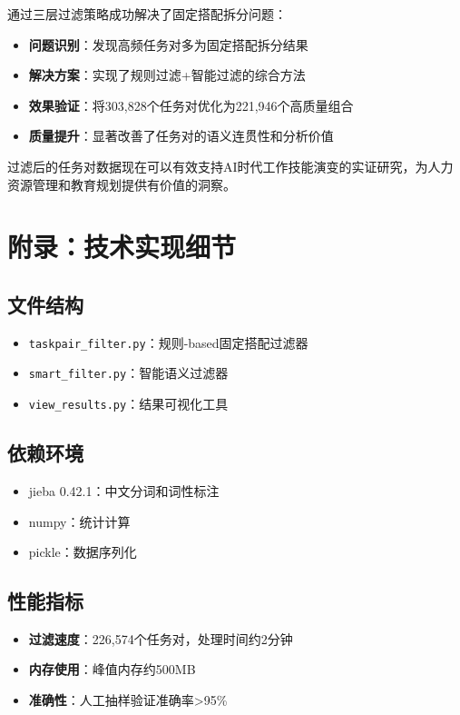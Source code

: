 \documentclass[11pt,a4paper]{article}
\begin{document}
通过三层过滤策略成功解决了固定搭配拆分问题：

\begin{itemize}
    \item \textbf{问题识别}：发现高频任务对多为固定搭配拆分结果
    \item \textbf{解决方案}：实现了规则过滤+智能过滤的综合方法
    \item \textbf{效果验证}：将303,828个任务对优化为221,946个高质量组合
    \item \textbf{质量提升}：显著改善了任务对的语义连贯性和分析价值
\end{itemize}

过滤后的任务对数据现在可以有效支持AI时代工作技能演变的实证研究，为人力资源管理和教育规划提供有价值的洞察。

\section{附录：技术实现细节}

\subsection{文件结构}

\begin{itemize}
    \item \texttt{taskpair\_filter.py}：规则-based固定搭配过滤器
    \item \texttt{smart\_filter.py}：智能语义过滤器
    \item \texttt{view\_results.py}：结果可视化工具
\end{itemize}

\subsection{依赖环境}

\begin{itemize}
    \item jieba 0.42.1：中文分词和词性标注
    \item numpy：统计计算
    \item pickle：数据序列化
\end{itemize}

\subsection{性能指标}

\begin{itemize}
    \item \textbf{过滤速度}：226,574个任务对，处理时间约2分钟
    \item \textbf{内存使用}：峰值内存约500MB
    \item \textbf{准确性}：人工抽样验证准确率>95\%
\end{itemize}
\end{document}
